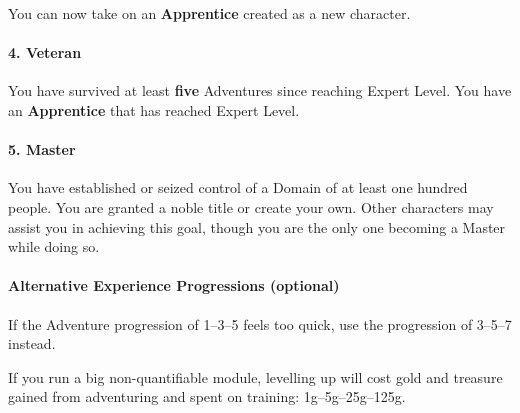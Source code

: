 \documentclass[itdr/core]{subfiles}
\begin{document}
You can now take on an \textbf{Apprentice} created as a new character.

\paragraph{4. Veteran}
You have survived at least \textbf{five} Adventures since reaching Expert Level. You have an \textbf{Apprentice} that has reached Expert Level.

\paragraph{5. Master}
You have established or seized control of a Domain of at least one hundred people. You are granted a noble title or create your own. Other characters may assist you in achieving this goal, though you are the only one becoming a Master while doing so.

\vfill
\begin{dbox}
	\paragraph{Alternative Experience Progressions (optional)}
	If the Adventure progression of 1--3--5 feels too quick, use the progression of 3--5--7 instead.

	If you run a big non-quantifiable module, levelling up will cost gold and treasure gained from adventuring and spent on training: 1g--5g--25g--125g.
\end{dbox}
\end{document}
